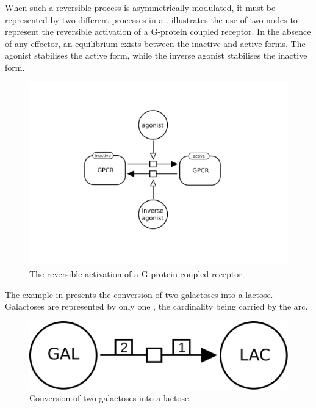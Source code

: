When such a reversible process is asymmetrically modulated, it must be represented by two different processes in a \PD.   illustrates the use of two  nodes to represent the reversible activation of a G-protein coupled receptor.  In the absence of any effector, an equilibrium exists between the inactive and active forms.  The agonist stabilises the active form, while the inverse agonist stabilises the inactive form.

\begin{figure}[htb]
  \centering
  \includegraphics[scale = 0.3]{examples/process-modulated}
  \caption{The reversible activation of a G-protein coupled receptor.}
  \label{fig:techref:trans-mod}
\end{figure}

The example in  presents the conversion of two galactoses into a lactose.  Galactoses are represented by only one , the cardinality being carried by the  arc.

\begin{figure}[htb]
  \centering
  \includegraphics[scale = 0.3]{examples/process-dimerisation}
  \caption{Conversion of two galactoses into a lactose.}
  \label{fig:techref:trans-dim}
\end{figure}


